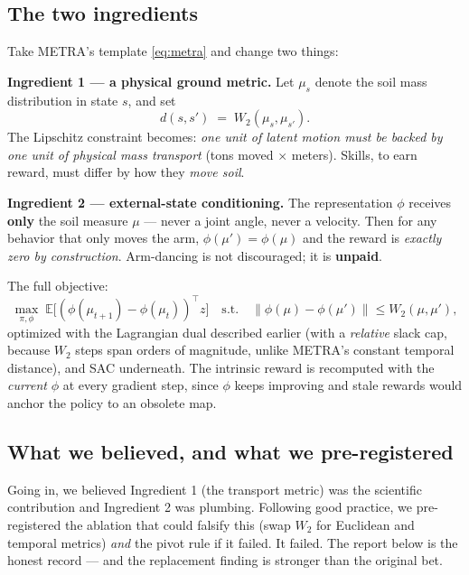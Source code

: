 \documentclass[11pt,a4paper]{article}
\begin{document}
\subsection{The two ingredients}

Take METRA's template \eqref{eq:metra} and change two things:

\textbf{Ingredient 1 — a physical ground metric.} Let $\mu_s$ denote the soil
mass distribution in state $s$, and set
\[
d(s, s') \;=\; W_2(\mu_s, \mu_{s'}).
\]
The Lipschitz constraint becomes: \emph{one unit of latent motion must be backed
by one unit of physical mass transport} (tons moved $\times$ meters). Skills, to
earn reward, must differ by how they \emph{move soil}.

\textbf{Ingredient 2 — external-state conditioning.} The representation $\phi$
receives \textbf{only} the soil measure $\mu$ --- never a joint angle, never a
velocity. Then for any behavior that only moves the arm, $\phi(\mu') = \phi(\mu)$
and the reward is \emph{exactly zero by construction}. Arm-dancing is not
discouraged; it is \textbf{unpaid}.

The full objective:
\begin{equation}
\max_{\pi, \phi} \; \mathbb{E}\big[(\phi(\mu_{t+1}) - \phi(\mu_t))^{\!\top} z\big]
\quad \text{s.t.} \quad
\|\phi(\mu) - \phi(\mu')\| \le W_2(\mu, \mu'),
\label{eq:tmsd}
\end{equation}
optimized with the Lagrangian dual described earlier (with a \emph{relative}
slack cap, because $W_2$ steps span orders of magnitude, unlike METRA's constant
temporal distance), and SAC underneath. The intrinsic reward is recomputed with
the \emph{current} $\phi$ at every gradient step, since $\phi$ keeps improving
and stale rewards would anchor the policy to an obsolete map.

\subsection{What we believed, and what we pre-registered}
Going in, we believed Ingredient 1 (the transport metric) was the scientific
contribution and Ingredient 2 was plumbing. Following good practice, we
pre-registered the ablation that could falsify this (swap $W_2$ for Euclidean
and temporal metrics) \emph{and} the pivot rule if it failed. It failed. The
report below is the honest record --- and the replacement finding is stronger
than the original bet.
\end{document}
